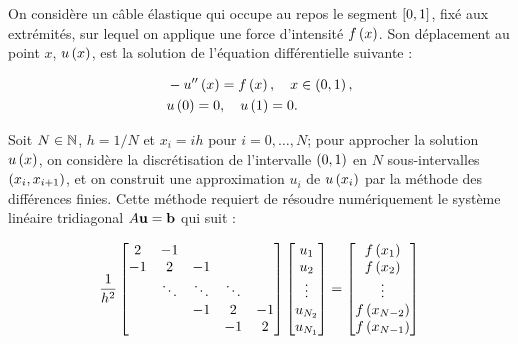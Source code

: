 On considère un câble élastique qui occupe au repos le segment $\squared{0, 1}$, fixé aux extrémités, sur lequel on applique une force d'intensité $f \parent{x}$.
Son déplacement au point $x$, $u \parent{x}$, est la solution de l'équation différentielle suivante :

\begin{equation}
\label{eq:equadiff}  
  \begin{split}
      &  - u'' \parent{x} = f \parent{x}, \quad x \in \parent{0, 1}, \\
      &  u \parent{0} = 0, \quad u \parent{1} = 0.
  \end{split}
\end{equation}

Soit $N \in \N$, $h = 1/N$ et $x_{i} = ih$ pour $i = 0, \dots, N$; pour approcher la solution $u \parent{x}$, on considère la discrétisation de l'intervalle $\parent{0, 1}$ en $N$ sous-intervalles $\parent{x_{i}, x_{i+1}}$, et on construit une approximation $u_{i}$ de $u \parent{x_{i}}$ par la méthode des différences finies.
Cette méthode requiert de résoudre numériquement le système linéaire tridiagonal $A \BoldU = \BoldB$ qui suit :

\begin{equation}
\label{eq:systri}
  \dfrac{1}{h^{2}}
  \begin{bmatrix}
        2       &   -1    &             &         &     \\
       -1       &   2     &      -1     &         &     \\
                & \ddots  &   \ddots    &  \ddots &     \\
                &         &      -1     &     2   &  -1   \\
                &         &             &    -1   &   2
  \end{bmatrix}
  \begin{bmatrix}
    u_{1} \\
    u_{2} \\
    \vdots \\
    u_{N_2} \\
    u_{N_1} 
  \end{bmatrix}
  =
  \begin{bmatrix}
    f \parent{x_{1}} \\
    f \parent{x_{2}}  \\
    \vdots \\
    f \parent{x_{N-2}}  \\
    f \parent{x_{N-1}}  
  \end{bmatrix}
\end{equation}

